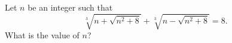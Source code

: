 Let $n$ be an integer such that
\[
\sqrt[3]{n+\sqrt{n^2+8}}+\sqrt[3]{n-\sqrt{n^2+8}}=8 .
\]
What is the value of $n$?
